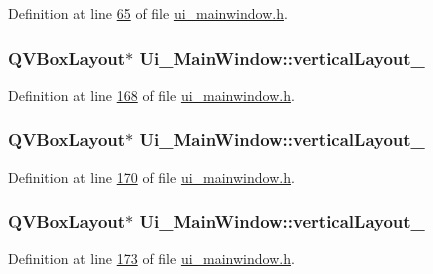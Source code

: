 Definition at line \hyperlink{a00052_source_l00065}{65} of file \hyperlink{a00052_source}{ui\+\_\+mainwindow.\+h}.

\hypertarget{a00027_a0c01bad60d9f422a1258e710635a2f65}{
\subsubsection[{vertical\+Layout\+\_\+2}]{\setlength{\rightskip}{0pt plus 5cm}Q\+V\+Box\+Layout$\ast$ Ui\+\_\+\+Main\+Window\+::vertical\+Layout\+\_}}\label{a00027_a0c01bad60d9f422a1258e710635a2f65}


Definition at line \hyperlink{a00052_source_l00168}{168} of file \hyperlink{a00052_source}{ui\+\_\+mainwindow.\+h}.

\hypertarget{a00027_a38b8a4b887f3b58e2a49e7905ae6f1f0}{
\subsubsection[{vertical\+Layout\+\_\+3}]{\setlength{\rightskip}{0pt plus 5cm}Q\+V\+Box\+Layout$\ast$ Ui\+\_\+\+Main\+Window\+::vertical\+Layout\+\_}}\label{a00027_a38b8a4b887f3b58e2a49e7905ae6f1f0}


Definition at line \hyperlink{a00052_source_l00170}{170} of file \hyperlink{a00052_source}{ui\+\_\+mainwindow.\+h}.

\hypertarget{a00027_a6f40fc110b15410c00837a446d57bdbe}{
\subsubsection[{vertical\+Layout\+\_\+4}]{\setlength{\rightskip}{0pt plus 5cm}Q\+V\+Box\+Layout$\ast$ Ui\+\_\+\+Main\+Window\+::vertical\+Layout\+\_}}\label{a00027_a6f40fc110b15410c00837a446d57bdbe}


Definition at line \hyperlink{a00052_source_l00173}{173} of file \hyperlink{a00052_source}{ui\+\_\+mainwindow.\+h}.

